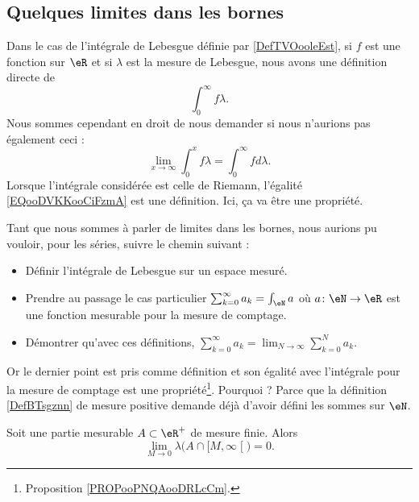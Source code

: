 \subsection{Quelques limites dans les bornes}

Dans le cas de l'intégrale de Lebesgue définie par \ref{DefTVOooleEst}, si \( f\) est une fonction sur \( \eR\) et si \( \lambda\) est la mesure de Lebesgue, nous avons une définition directe de
\begin{equation}
    \int_{0}^{\infty}f\lambda.
\end{equation}
Nous sommes cependant en droit de nous demander si nous n'aurions pas également ceci :
\begin{equation}        \label{EQooDVKKooCiFzmA}
    \lim_{x\to \infty} \int_0^xf\lambda=\int_0^{\infty}fd\lambda.
\end{equation}
Lorsque l'intégrale considérée est celle de Riemann, l'égalité \eqref{EQooDVKKooCiFzmA} est une définition. Ici, ça va être une propriété.

\begin{normaltext}
    Tant que nous sommes à parler de limites dans les bornes, nous aurions pu vouloir, pour les séries, suivre le chemin suivant :
    \begin{itemize}
        \item Définir l'intégrale de Lebesgue sur un espace mesuré.
        \item Prendre au passage le cas particulier \( \sum_{k=0}^{\infty}a_k=\int_\eN a\) où \( a\colon \eN\to \eR\) est une fonction mesurable pour la mesure de comptage.
        \item Démontrer qu'avec ces définitions, \( \sum_{k=0}^{\infty}a_k=\lim_{N\to \infty} \sum_{k=0}^Na_k\).
    \end{itemize}
    Or le dernier point est pris comme définition et son égalité avec l'intégrale pour la mesure de comptage est une propriété\footnote{Proposition \ref{PROPooPNQAooDRLcCm}.}. Pourquoi ? Parce que la définition \ref{DefBTsgznn} de mesure positive demande déjà d'avoir défini les sommes sur \( \eN\).
\end{normaltext}

\begin{lemma}
    Soit une partie mesurable \( A\subset \eR^+\) de mesure finie. Alors
    \begin{equation}
        \lim_{M\to 0} \lambda\big( A\cap\mathopen[ M , \infty \mathclose[ \big)=0.
    \end{equation}
\end{lemma}

